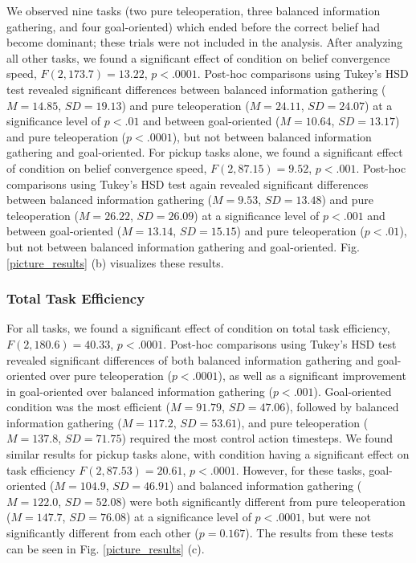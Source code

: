 \documentclass[conference]{IEEEtran}
\begin{document}
We observed nine tasks (two pure teleoperation, three balanced information gathering, and four goal-oriented) which ended before the correct belief had become dominant; these trials were not included in the analysis. After analyzing all other tasks, we found a significant effect of condition on belief convergence speed, $F(2, 173.7) = 13.22$, $p < .0001$. Post-hoc comparisons using Tukey's HSD test revealed significant differences between balanced information gathering ($M = 14.85$, $SD = 19.13$) and pure teleoperation ($M = 24.11$, $SD = 24.07$) at a significance level of $p < .01$ and between goal-oriented ($M = 10.64$, $SD = 13.17$) and pure teleoperation ($p < .0001$), but not between balanced information gathering and goal-oriented. For pickup tasks alone, we found a significant effect of condition on belief convergence speed, $F(2, 87.15) = 9.52$, $p < .001$. Post-hoc comparisons using Tukey's HSD test again revealed significant differences between balanced information gathering ($M = 9.53$, $SD = 13.48$) and pure teleoperation ($M = 26.22$, $SD = 26.09$) at a significance level of $p < .001$ and between goal-oriented ($M = 13.14$, $SD = 15.15$) and pure teleoperation ($p < .01$), but not between balanced information gathering and goal-oriented. Fig. \ref{picture_results} (b) visualizes these results.

\subsubsection{Total Task Efficiency}

For all tasks, we found a significant effect of condition on total task efficiency, $F(2, 180.6) = 40.33$, $p < .0001$. Post-hoc comparisons using Tukey's HSD test revealed significant differences of both balanced information gathering and goal-oriented over pure teleoperation ($p < .0001$), as well as a significant improvement in goal-oriented over balanced information gathering ($p < .001$). Goal-oriented condition was the most efficient ($M = 91.79$, $SD = 47.06$), followed by balanced information gathering ($M = 117.2$, $SD = 53.61$), and pure teleoperation ($M = 137.8$, $SD = 71.75$) required the most control action timesteps. We found similar results for pickup tasks alone, with condition having a significant effect on task efficiency $F(2, 87.53) = 20.61$, $p < .0001$. However, for these tasks, goal-oriented ($M = 104.9$, $SD = 46.91$) and balanced information gathering ($M = 122.0$, $SD = 52.08$) were both significantly different from pure teleoperation ($M = 147.7$, $SD = 76.08$) at a significance level of $p < .0001$, but were not significantly different from each other ($p = 0.167$). The results from these tests can be seen in Fig. \ref{picture_results} (c).
\end{document}
